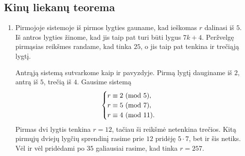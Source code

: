 \subsection*{Kinų liekanų teorema}
\begin{enumerate}
\item
    Pirmojoje sistemoje iš pirmos lygties gauname, kad ieškomas $r$ dalinasi
    iš $5$. Iš antros lygties žinome, kad jis taip pat turi būti lygus
    $7k+4$. Peržvelgę pirmąsias reikšmes randame, kad tinka $25$, o jis taip
    pat tenkina ir trečiąją lygtį.
    
    Antrąją sistemą sutvarkome kaip ir pavyzdyje. Pirmą lygtį dauginame iš
    $2$, antrą iš $5$, trečią iš $4$. Gausime sistemą $$\begin{cases}
    r\equiv 2 \ (\text{mod } 5), \\ r\equiv 5 \ (\text{mod } 7), \\ r\equiv 4 \ (\text{mod } 11). \end{cases}$$
    Pirmas dvi lygtis tenkina $r=12$, tačiau ši reikšmė netenkina trečios.
    Kitą pirmųjų dviejų lygčių sprendinį rasime prie $12$ pridėję $5\cdot
    7$, bet ir šis netiks. Vėl ir vėl pridėdami po $35$ galiausiai rasime,
    kad tinka $r=257$.
    

\end{enumerate}

